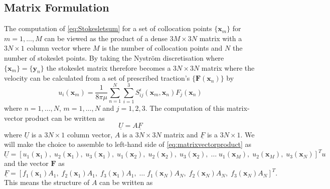 \subsection{Matrix Formulation} \label{subsec:MatrixForm}
The computation of \cref{eq:Stokesletsum} for a set of collocation points $\{\bm{x}_m\}$  for $m = 1,...,M$ can be viewed as the product of a dense $3M \times 3N$ matrix with a $3N \times 1$ column vector where $M$ is the number of collocation points and $N$ the number of stokeslet points. By taking the Nyström discretisation \cite{Nystrom1930UberRandwertaufgaben} where $\{\bm{x}_m\} = \{\bm{y}_n\}$ the stokeslet matrix therefore becomes a $3N \times 3N$ matrix where the velocity can be calculated from a set of prescribed traction's $\{\bm{F}(\bm{x}_n)\}$ by
\begin{equation}
\label{eq:Nystrom}
    u_{i}\left(\bm{x}_m\right)=\frac{1}{8 \pi \mu} \sum_{n=1}^{N} \sum_{i=1}^{3} S_{i j}^{\epsilon}\left(\bm{x}_m, {\bm{x}}_{n}\right) {F}_{j}({\bm{x}}_{n})
\end{equation}
where $n=1,\dots,N$, $m=1,\dots,N$ and $j=1,2,3$. The computation of this matrix-vector product can be written as 
\begin{equation}
\label{eq:matrixvectorproduct}
    \underline{U} = A \underline{F}
\end{equation}
where $\underline{U}$ is a $3N \times 1$ column vector, $A$ is a $3N \times 3N$ matrix and $\underline{F}$ is a $3N \times 1$. We will make the choice to assemble to left-hand side of \cref{eq:matrixvectorproduct} as
\small
\begin{equation*}
    \underline{U} = [u_1({\bm{x}}_{1}), \; u_2({\bm{x}}_{1}), \; u_3({\bm{x}}_{1}), \; u_1({\bm{x}}_{2}), \; u_2({\bm{x}}_{2}), \; u_3({\bm{x}}_{2}), \; \dots \; u_1({\bm{x}}_{M}), \; u_2({\bm{x}}_{M}), \; u_3({\bm{x}}_{N})]^{T}u
\end{equation*}
\normalsize
and the vector $\bm{F}$ as
\small
\begin{equation*}
    \underline{F} = [{f}_{1}({\bm{x}}_{1})A_1, \; {f}_{2}({\bm{x}}_{1})A_1, \; {f}_{3}({\bm{x}}_{1})A_1,\; \dots \; {f}_{1}({\bm{x}}_{N})A_N, \; {f}_{2}({\bm{x}}_{N})A_N, \; f_{3}({\bm{x}}_{N})A_N]^{T}.
\end{equation*}
\normalsize
This means the structure of $A$ can be written as
\small
